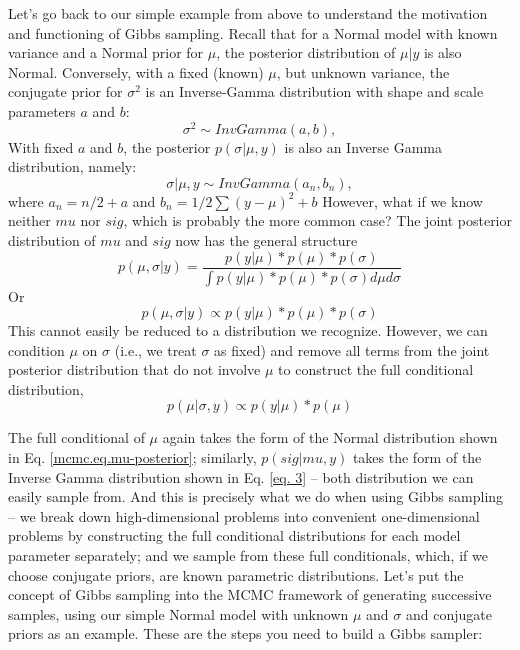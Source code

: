 Let's go back to our
simple example from above to understand the motivation and functioning
of Gibbs sampling. Recall that for a Normal model with known variance
and a Normal prior for $\mu$, the posterior distribution of $\mu|y$ is also
Normal. Conversely, with a fixed (known) $\mu$, but unknown variance, the
conjugate prior for $\sigma^2$ is an Inverse-Gamma distribution with shape and scale parameters $a$ and $b$:
\[
\sigma^2 \sim InvGamma(a,b),
\]
With fixed $a$ and $b$, the posterior $p(\sigma|\mu,y)$ is also an Inverse Gamma distribution, namely:
\begin{equation}
\sigma|\mu,y \sim Inv Gamma (a_n, b_n),
\label{eq. 3}
\end{equation}
 where  $a_n = n/2   + a$ and $b_n = 1/2 \sum (y-\mu)^2 + b$
However, what if we know neither $mu$ nor $sig$, which is probably the
more common case? The joint posterior distribution of $mu$ and $sig$
now has the general structure
\[
p(\mu, \sigma|y) = \frac{p(y|\mu)* p(\mu) *p(\sigma)}{ \int p(y|\mu)* p(\mu) *p(\sigma) d\mu d\sigma }
\]
Or
\[
p(\mu, \sigma|y) \propto p(y|\mu)* p(\mu) *p(\sigma)
\]
This cannot easily be reduced to a distribution we recognize. However,
we can condition $\mu$ on $\sigma$ (i.e., we treat $\sigma$ as fixed) and remove
all terms from the joint posterior distribution that do not involve $\mu$
to construct the full conditional distribution,
\[
p(\mu|\sigma,y)  \propto p(y|\mu)* p(\mu)
\]


The full conditional of $\mu$ again takes the form of the Normal
distribution shown in Eq. \ref{mcmc.eq.mu-posterior}; similarly, $p(sig|mu,y)$ takes
the form of the Inverse Gamma distribution shown in
Eq. \ref{eq. 3}  – both distribution we can easily sample
from. And this is precisely what we do when using Gibbs sampling – we
break down high-dimensional problems into convenient one-dimensional
problems by constructing the full conditional distributions for each
model parameter separately; and we sample from these full
conditionals, which, if we choose conjugate priors, are known
parametric distributions.
Let's put the concept of Gibbs sampling into the MCMC framework of
generating successive samples, using our simple Normal model with
unknown $\mu$ and $\sigma$ and conjugate priors as an example. These are the
steps you need to build a Gibbs sampler:

